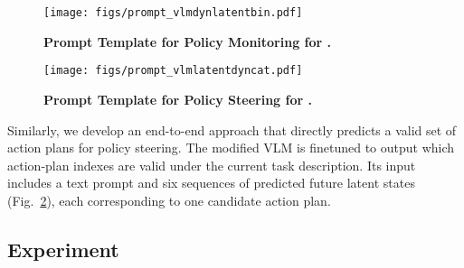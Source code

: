     \begin{figure}[h!]
        \centering
        \texttt{[image: figs/prompt\_vlmdynlatentbin.pdf]}
        \caption{\textbf{Prompt Template for Policy Monitoring for \vlmdynlatentbin.}}
        \label{fig:prompt_vlmdynlatentbin}
    \end{figure}
            \begin{figure}[h!]
        \centering
        \texttt{[image: figs/prompt\_vlmlatentdyncat.pdf]}
        \caption{\textbf{Prompt Template for Policy Steering for \vlmdynlatentcat.}}
        \label{fig:prompt_vlmdynlatentcat}
    \end{figure}
    \para{\vlmdynlatentcat} 
Similarly, we develop an end-to-end approach that directly predicts a valid set of action plans for policy steering. The modified VLM is finetuned to output which action‐plan indexes are valid under the current task description. Its input includes a text prompt and six sequences of predicted future latent states (Fig.~\ref{fig:prompt_vlmdynlatentcat}), each corresponding to one candidate action plan.
    


\subsection{Experiment}
